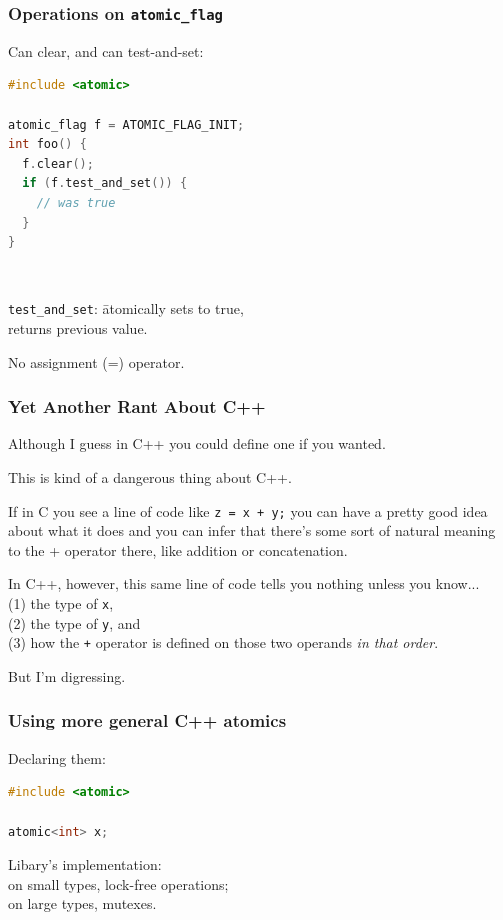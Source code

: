 \begin{frame}[fragile]
  \frametitle{Operations on {\tt atomic\_flag}}
  
    Can clear, and can test-and-set:
    \begin{lstlisting}[language=C]
#include <atomic>

atomic_flag f = ATOMIC_FLAG_INIT;
int foo() {
  f.clear();
  if (f.test_and_set()) {
    // was true
  }
}
    \end{lstlisting}
    ~\\
    \begin{tabbing}
      {\tt test\_and\_set}: \= atomically sets to true, \\
      \> returns previous value.
    \end{tabbing}
    No assignment (=) operator.
  
\end{frame}



\begin{frame}
\frametitle{Yet Another Rant About C++}

Although I guess in C++ you could define one if you wanted. 

This is kind of a dangerous thing about C++. 

If in C you see a line of code like \texttt{z = x + y;} you can have a pretty good idea about what it does and you can infer that there's some sort of natural meaning to the + operator there, like addition or concatenation. 

In C++, however, this same line of code tells you nothing unless you know...\\
\quad (1) the type of \texttt{x},\\
\quad (2) the type of \texttt{y}, and\\
\quad (3) how the \texttt{+} operator is defined on those two operands \textit{in that order}. 

But I'm digressing.


\end{frame}

\begin{frame}[fragile]
  \frametitle{Using more general C++ atomics}


    Declaring them:
  
\begin{lstlisting}[language=C]
#include <atomic>

atomic<int> x;
\end{lstlisting}

Libary's implementation: \\
\hspace*{1em} on small types, lock-free operations;\\
\hspace*{1em} on large types, mutexes.
  

\end{frame}

